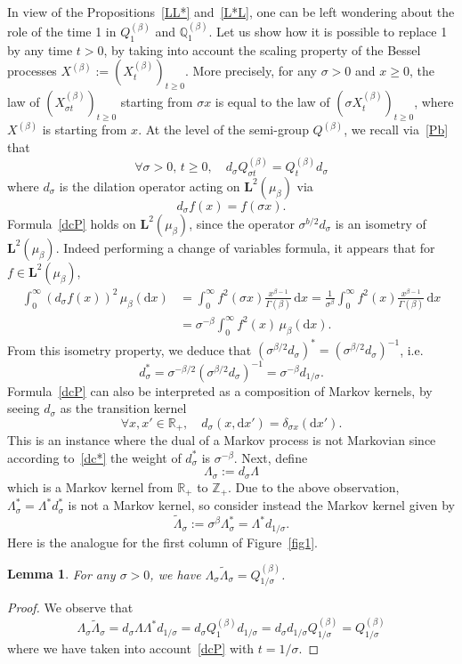 \documentclass[10pt]{amsart}
\newtheorem{lemm}[theo]{Lemma}\newtheorem{prop}[theo]{Proposition}\newtheorem{coro}[theo]{Corollary}\newtheorem{conj}[theo]{Conjecture}
\theoremstyle{definition}\newtheorem{defi}[theo]{Definition}\newtheorem{rema}[theo]{Remark}\newtheorem{exam}[theo]{Example}\newtheorem{exem}[theo]{Example}\newtheorem{nota}[theo]{Notation}
\newcommand{\df}{\mathrel{:=}}
\newcommand{\RR}{\mathbb{R}}
\newcommand{\ZZ}{\mathbb{Z}}
\newcommand{\iy}{\infty}
\newcommand{\wi}{\widetilde}
\newcommand{\dBs}{{\discret{Q}}}
\newcommand{\Bs}{Q}
\newcommand{\esL}{\mathbf{L}}
\newcommand{\discret}[1]{\mathds{#1}}
\newcommand{\cont}[1]{{#1}}
\newcommand{\adjL}{\Lambda^*}
\let\oldforall\forall
\renewcommand*{\forall}{\mathrel{\oldforall}}
\newcommand*{\dd}{\mathrm{d}}
\newcommand*{\dx}{\dd x}
\begin{document}
In view of the Propositions~\ref{LL*} and~\ref{L*L}, one can be left wondering about the role of the time 1 in $\Bs^{(\beta)}_1$ and $\dBs^{(\beta)}_1$. Let us show how it is possible to replace 1 by any time $t>0$, by taking into account the scaling property of the Bessel processes $X^{(\beta)}\df (X_t^{(\beta)})_{t\geq 0}$. More precisely, for any $\sigma>0$ and $x\geq 0$, the law of $(X^{(\beta)}_{\sigma t})_{t\geq 0}$ starting from $\sigma x$ is equal to the law of $(\sigma X^{(\beta)}_t)_{t\geq 0}$, where $X^{(\beta)}$ is starting from $x$. At the level of the semi-group $\Bs^{(\beta)}$, we recall via~\eqref{Pb} that
\begin{equation}\label{dcP}
\forall \sigma>0,\,t\geq 0,\quad d_\sigma\Bs_{\sigma t}^{(\beta)}=\Bs_t^{(\beta)}d_\sigma
\end{equation}
where $d_\sigma$ is the dilation operator acting on $\esL^2(\mu_{\beta})$ via
\[
d_\sigma f (x)=f(\sigma x).
\]
Formula~\eqref{dcP} holds on $\esL^2(\mu_{\beta})$, since the operator $\sigma^{b/2}d_\sigma$ is an isometry of $\esL^2(\mu_{\beta})$. Indeed performing a change of variables formula, it appears that for $f\in
\esL^2(\mu_{\beta})$,
\begin{align*}
\int_0^{\iy} (d_\sigma f(x))^2\,\mu_{\beta}(\dx)&=\int_0^{\iy} f^2(\sigma x)\frac{x^{\beta-1}}{\Gamma(\beta)}\,\dx =\frac{1}{\sigma^{\beta}}\int_0^{\iy} f^2(x)\frac{x^{\beta-1}}{\Gamma(\beta)}\,\dx\\
&=\sigma^{-\beta}\int_0^{\iy} f^2(x)\,\mu_{\beta}(\dx).
\end{align*}
From this isometry property, we deduce that $(\sigma^{\beta/2} d_\sigma)^*=(\sigma^{\beta/2}d_\sigma)^{-1}$, i.e.
\begin{equation}\label{dc*}
\cont{d}^*_{\sigma}=\sigma^{-\beta/2}(\sigma^{\beta/2}d_\sigma)^{-1}=\sigma^{-\beta}\cont{d}_{1/\sigma}.
\end{equation}
Formula~\eqref{dcP} can also be interpreted as a composition of Markov kernels, by seeing $d_\sigma$ as the transition kernel
\[
\forall x,x'\in \RR_+,\quad d_\sigma(x,\dx')=\delta_{\sigma x}(\dx').
\]
This is an instance where the dual of a Markov process is not Markovian since according to~\eqref{dc*} the weight of $d_\sigma^*$ is $\sigma^{-\beta}$. Next, define
\[
\Lambda_{\sigma}\df d_\sigma \Lambda
\]
which is a Markov kernel from $\RR_+$ to $\ZZ_+$. Due to the above observation, $\Lambda_\sigma^*=\Lambda^* d_\sigma^*$ is not a Markov kernel, so consider instead the Markov kernel given by
\[
\wi \Lambda _{\sigma}\df \sigma^{\beta}\Lambda_\sigma^*=\Lambda^* \cont{d}_{1/\sigma}.
\]
Here is the analogue for the first column of Figure~\ref{fig1}.
\begin{lemm}\label{LcLc1}
For any $\sigma>0$, we have $\Lambda_{\sigma}\wi\Lambda_{\sigma}= \Bs_{1/\sigma}^{(\beta)}$.
\end{lemm}
\begin{proof}
We observe that
\[
\Lambda_{\sigma}\wi\Lambda_{\sigma}= d_\sigma \Lambda\adjL \cont{d}_{1/\sigma}=d_\sigma\Bs_1^{(\beta)}\cont{d}_{1/\sigma}=d_\sigma\cont{d}_{1/\sigma}\Bs^{(\beta)}_{1/\sigma}=\Bs^{(\beta)}_{1/\sigma}
\]
where we have taken into account~\eqref{dcP} with $t=1/\sigma$.
\end{proof}
\end{document}
